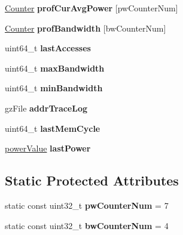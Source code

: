 \begin{DoxyCompactItemize}
\item 
\hypertarget{classMemControllerBase_a03a2afcd0d99f8fc0fd6ea25785ed989}{\hyperlink{classCounter}{Counter} {\bfseries prof\-Cur\-Avg\-Power} \mbox{[}pw\-Counter\-Num\mbox{]}}\label{classMemControllerBase_a03a2afcd0d99f8fc0fd6ea25785ed989}

\item 
\hypertarget{classMemControllerBase_ae1c8deb1b2e23cae9fc4a2379ba23c71}{\hyperlink{classCounter}{Counter} {\bfseries prof\-Bandwidth} \mbox{[}bw\-Counter\-Num\mbox{]}}\label{classMemControllerBase_ae1c8deb1b2e23cae9fc4a2379ba23c71}

\item 
\hypertarget{classMemControllerBase_a032e3ffd8e0802deb05e31b777077370}{uint64\-\_\-t {\bfseries last\-Accesses}}\label{classMemControllerBase_a032e3ffd8e0802deb05e31b777077370}

\item 
\hypertarget{classMemControllerBase_a0984e4d7df120b26b706e7462d660a89}{uint64\-\_\-t {\bfseries max\-Bandwidth}}\label{classMemControllerBase_a0984e4d7df120b26b706e7462d660a89}

\item 
\hypertarget{classMemControllerBase_af72b5a84705a24abca3be393b2b3b18f}{uint64\-\_\-t {\bfseries min\-Bandwidth}}\label{classMemControllerBase_af72b5a84705a24abca3be393b2b3b18f}

\item 
\hypertarget{classMemControllerBase_a0fc1ddd85369eefdb19fa006bb63237f}{gz\-File {\bfseries addr\-Trace\-Log}}\label{classMemControllerBase_a0fc1ddd85369eefdb19fa006bb63237f}

\item 
\hypertarget{classMemControllerBase_a89831cb6c1db3cea2d480afcab072718}{uint64\-\_\-t {\bfseries last\-Mem\-Cycle}}\label{classMemControllerBase_a89831cb6c1db3cea2d480afcab072718}

\item 
\hypertarget{classMemControllerBase_a2570f098bda4e1d3a1e9ba84304f4f45}{\hyperlink{structMemControllerBase_1_1powerValue}{power\-Value} {\bfseries last\-Power}}\label{classMemControllerBase_a2570f098bda4e1d3a1e9ba84304f4f45}

\end{DoxyCompactItemize}
\subsection*{Static Protected Attributes}
\begin{DoxyCompactItemize}
\item 
\hypertarget{classMemControllerBase_abbea344b9bf53819329a6bdfd7674a21}{static const uint32\-\_\-t {\bfseries pw\-Counter\-Num} = 7}\label{classMemControllerBase_abbea344b9bf53819329a6bdfd7674a21}

\item 
\hypertarget{classMemControllerBase_a7f242d938867a65e86e732e25e43bda1}{static const uint32\-\_\-t {\bfseries bw\-Counter\-Num} = 4}\label{classMemControllerBase_a7f242d938867a65e86e732e25e43bda1}

\end{DoxyCompactItemize}


